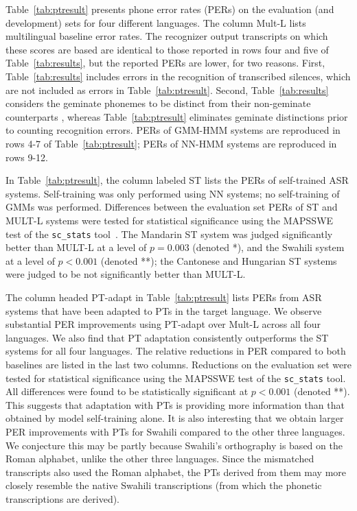 Table~\ref{tab:ptresult} presents phone error rates (PERs) on the
evaluation (and development) sets for four different languages. The
column {\sc Mult-L} lists multilingual baseline error rates.  The
recognizer output transcripts on which these scores are based are
identical to those reported in rows four and five of
Table~\ref{tab:results}, but the reported PERs are lower, for two
reasons.  First, Table~\ref{tab:results} includes errors in the
recognition of transcribed silences, which are not included as errors
in Table~\ref{tab:ptresult}.  Second, Table~\ref{tab:results}
considers the geminate phonemes \ipa{[a:,i:,u:,n:,k:,S:]} to be
distinct from their non-geminate counterparts \ipa{[a,i,u,n,k,S]},
whereas Table~\ref{tab:ptresult} eliminates geminate distinctions
prior to counting recognition errors.  PERs of GMM-HMM systems are
reproduced in rows 4-7 of Table~\ref{tab:ptresult}; PERs of NN-HMM
systems are reproduced in rows 9-12.

In Table~\ref{tab:ptresult}, the column labeled {\sc ST} lists the
PERs of self-trained ASR systems. Self-training was only performed
using NN systems; no self-training of GMMs was performed.  Differences
between the evaluation set PERs of {\sc ST} and {\sc MULT-L} systems
were tested for statistical significance using the MAPSSWE test of the
{\tt sc\_stats} tool~\cite{Pallet90}.  The Mandarin {\sc ST} system
was judged significantly better than {\sc MULT-L} at a level of
$p=0.003$ (denoted *), and the Swahili system at a level of $p<0.001$
(denoted **); the Cantonese and Hungarian {\sc ST} systems were judged
to be not significantly better than {\sc MULT-L}.

The column headed {\sc PT-adapt} in Table~\ref{tab:ptresult} lists
PERs from ASR systems that have been adapted to PTs in the target
language. We observe substantial PER improvements using {\sc PT-adapt}
over {\sc Mult-L} across all four languages. We also find that PT
adaptation consistently outperforms the {\sc ST} systems for all four
languages. The relative reductions in PER compared to both baselines
are listed in the last two columns.  Reductions on the evaluation set
were tested for statistical significance using the MAPSSWE test of the
{\tt sc\_stats} tool.  All differences were found to be statistically
significant at $p<0.001$ (denoted **).  This suggests that adaptation
with PTs is providing more information than that obtained by model
self-training alone. It is also interesting that we obtain larger PER
improvements with PTs for Swahili compared to the other three
languages. We conjecture this may be partly because Swahili's
orthography is based on the Roman alphabet, unlike the other three
languages. Since the mismatched transcripts also used the Roman
alphabet, the PTs derived from them may more closely resemble the
native Swahili transcriptions (from which the phonetic transcriptions
are derived).

